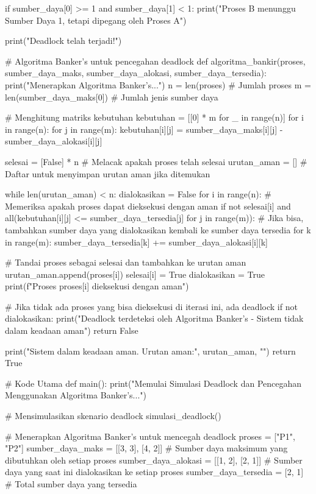\documentclass[12pt]{article}
\begin{document}
\begin{itemize}
\begin{python}
    if sumber_daya[0] >= 1 and sumber_daya[1] < 1:
        print("Proses B menunggu Sumber Daya 1, tetapi dipegang oleh Proses A")
        
    print("Deadlock telah terjadi!\n")

# Algoritma Banker's untuk pencegahan deadlock
def algoritma_bankir(proses, sumber_daya_maks, sumber_daya_alokasi, sumber_daya_tersedia):
    print("Menerapkan Algoritma Banker's...")
    n = len(proses)  # Jumlah proses
    m = len(sumber_daya_maks[0])  # Jumlah jenis sumber daya

    # Menghitung matriks kebutuhan
    kebutuhan = [[0] * m for _ in range(n)]
    for i in range(n):
        for j in range(m):
            kebutuhan[i][j] = sumber_daya_maks[i][j] - sumber_daya_alokasi[i][j]

    selesai = [False] * n  # Melacak apakah proses telah selesai
    urutan_aman = []    # Daftar untuk menyimpan urutan aman jika ditemukan
    
    while len(urutan_aman) < n:
        dialokasikan = False
        for i in range(n):
            # Memeriksa apakah proses dapat dieksekusi dengan aman
            if not selesai[i] and all(kebutuhan[i][j] <= sumber_daya_tersedia[j] for j in range(m)):
                # Jika bisa, tambahkan sumber daya yang dialokasikan kembali ke sumber daya tersedia
                for k in range(m):
                    sumber_daya_tersedia[k] += sumber_daya_alokasi[i][k]
                
                # Tandai proses sebagai selesai dan tambahkan ke urutan aman
                urutan_aman.append(proses[i])
                selesai[i] = True
                dialokasikan = True
                print(f"Proses {proses[i]} dieksekusi dengan aman")
        
        # Jika tidak ada proses yang bisa dieksekusi di iterasi ini, ada deadlock
        if not dialokasikan:
            print("Deadlock terdeteksi oleh Algoritma Banker's - Sistem tidak dalam keadaan aman\n")
            return False

    print("Sistem dalam keadaan aman. Urutan aman:", urutan_aman, "\n")
    return True

# Kode Utama
def main():
    print("Memulai Simulasi Deadlock dan Pencegahan Menggunakan Algoritma Banker's...\n")
    
    # Mensimulasikan skenario deadlock
    simulasi_deadlock()
    
    # Menerapkan Algoritma Banker's untuk mencegah deadlock
    proses = ["P1", "P2"]
    sumber_daya_maks = [[3, 3], [4, 2]]  # Sumber daya maksimum yang dibutuhkan oleh setiap proses
    sumber_daya_alokasi = [[1, 2], [2, 1]]  # Sumber daya yang saat ini dialokasikan ke setiap proses
    sumber_daya_tersedia = [2, 1]  # Total sumber daya yang tersedia


\end{python}
\end{itemize}
\end{document}
